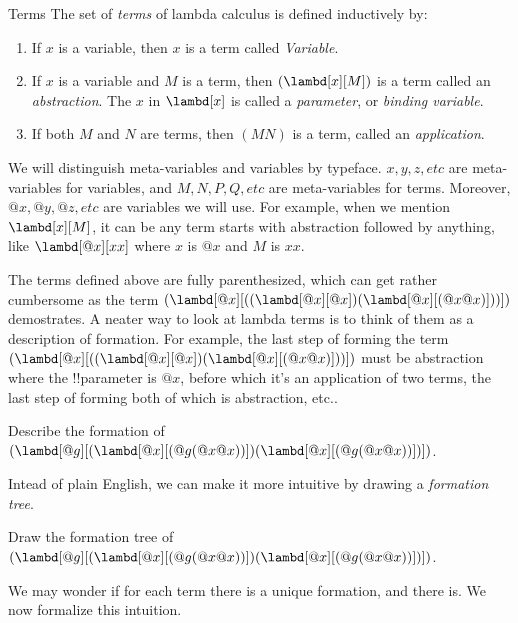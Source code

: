 \documentclass[../../../include/open-logic-section]{subfiles}
\begin{document}

\begin{defn}{Terms} 
The set of \emph{terms} of lambda calculus is defined inductively by:
\begin{enumerate}
  \item {} If $x$ is a variable, then $x$ is a
    term called \emph{Variable}.
  \item {} If $x$ is a variable and $M$ is a term, then $(\lambd[x][M])$ is
    a term called an \emph{abstraction}. The $x$ in
    $\lambd[x]$ is called a \emph{parameter}, or \emph{binding variable}.
  \item {} If both $M$ and $N$ are terms, then
    $(MN)$ is a term, called an \emph{application}.
\end{enumerate}
\end{defn}

We will distinguish meta-variables and variables by typeface. $x, y,
z, etc$ are meta-variables for variables, and $M, N, P, Q, etc$ are
meta-variables for terms. Moreover,  $@x, @y, @z, etc$ are variables
we will use. For example, when we mention $\lambd[x][M]$, it can be
any term starts with abstraction followed by anything, like
$\lambd[@x][x x]$ where $x$ is $@x$ and $M$ is $x x$.


The terms defined above are fully parenthesized, which can get rather
cumbersome as the term $(\lambd[@x][((\lambd[@x][@x])(\lambd[@x][(@x@x)]))])$ demostrates. A neater way to look at lambda terms is to think of them as
a description of formation. For
example, the last step of forming the term $(\lambd[@x][((\lambd[@x][@x])(\lambd[@x][(@x@x)]))])$
must be abstraction where the !!{parameter} is $@x$, before which it's
an application of two terms, the last step of forming both of which is
abstraction, etc.. 

\begin{prob}
  Describe the formation of $(\lambd[@g][(\lambd[@x][(@g (@x @x))]) (\lambd[@x][(@g (@x @x))])])$.
\end{prob}

Intead of plain English, we can make it more intuitive by drawing a
\emph{formation tree}.

\begin{prob}
  Draw the formation tree of $(\lambd[@g][(\lambd[@x][(@g (@x @x))]) (\lambd[@x][(@g (@x @x))])])$.
\end{prob}

We may wonder if for each term there is a unique formation, and there
is. We now formalize this intuition.
\end{document}
